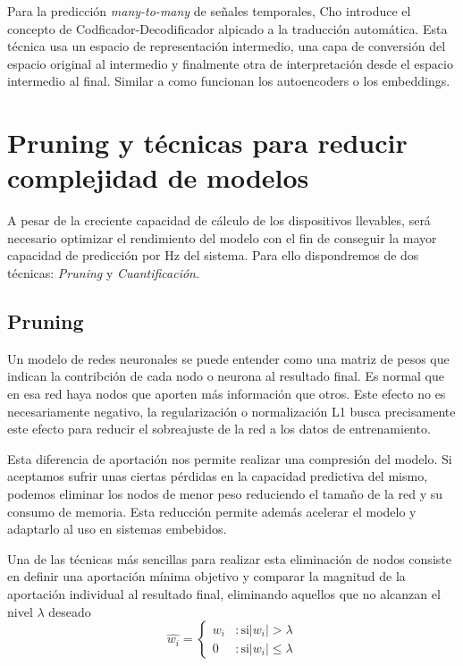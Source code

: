 \documentclass[../tfm.tex]{subfiles}
\begin{document}
Para la predicción \textit{many-to-many} de señales temporales, Cho \cite{cho2014} introduce el concepto de Codficador-Decodificador alpicado a la traducción automática. Esta técnica usa un espacio de representación intermedio, una capa de conversión del espacio original al intermedio y finalmente otra de interpretación desde el espacio intermedio al final. Similar a como funcionan los autoencoders o los embeddings.

\section{Pruning y técnicas para reducir complejidad de modelos}\label{sa_optimizacion}

A pesar de la creciente capacidad de cálculo de los dispositivos llevables, será necesario optimizar el rendimiento del modelo con el fin de conseguir la mayor capacidad de predicción por Hz del sistema. Para ello dispondremos de dos técnicas: \textit{Pruning} y \textit{Cuantificación}.

\subsection{Pruning}
Un modelo de redes neuronales se puede entender como una matriz de pesos que indican la contribción de cada nodo o neurona al resultado final. Es normal que en esa red haya nodos que aporten más información que otros. Este efecto no es necesariamente negativo, la regularización o normalización L1 busca precisamente este efecto para reducir el sobreajuste de la red a los datos de entrenamiento.

Esta diferencia de aportación nos permite realizar una compresión del modelo. Si aceptamos sufrir unas ciertas pérdidas en la capacidad predictiva del mismo, podemos eliminar los nodos de menor peso reduciendo el tamaño de la red y su consumo de memoria. Esta reducción permite además acelerar el modelo y adaptarlo al uso en sistemas embebidos.


Una de las técnicas más sencillas para realizar esta eliminación de nodos consiste en definir una aportación mínima objetivo y comparar la magnitud de la aportación individual al resultado final, eliminando aquellos que no alcanzan el nivel $\lambda$ deseado
\[
\hat{w_i} = \left\{ \begin{matrix} w_i & :\mbox{si} |w_i|>\lambda\\
  0 & :\mbox{si} |w_i|\leq\lambda\end{matrix} \right.
\]
\end{document}
